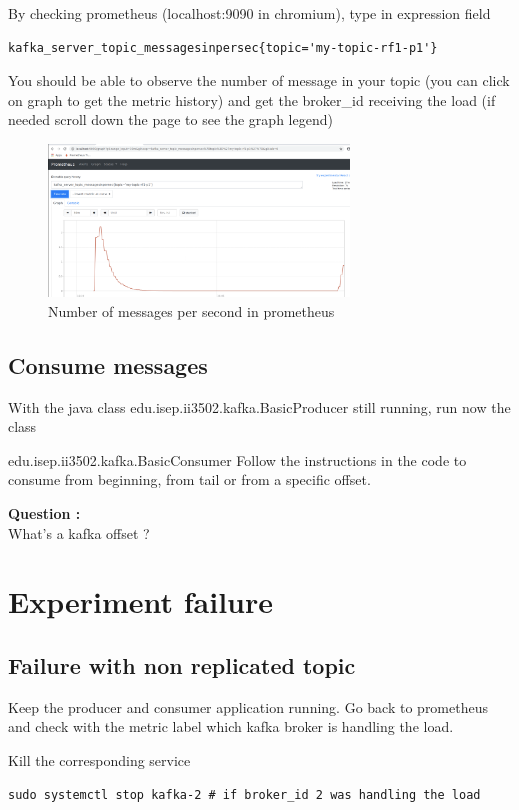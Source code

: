 \documentclass{article}
\newcounter{question}
\newenvironment{question}
    { \begin{mdframed}[backgroundcolor=gray!20] \textbf{Question \arabic{question} : } \stepcounter{question} \\}
    {  \end{mdframed}}
\newenvironment{code}
    { \begin{mdframed} }    {  \end{mdframed}}
\begin{document}
By checking prometheus (localhost:9090 in chromium), type in expression field
  \begin{verbatim}
kafka_server_topic_messagesinpersec{topic='my-topic-rf1-p1'}
    \end{verbatim}

You should be able to observe the number of message in your topic (you can click on graph to get the metric history) and get the broker_id receiving the load (if needed scroll down the page to see the graph legend)

\begin{figure}[H]
\includegraphics[width=8cm]{prometheus.png}
\caption{Number of messages per second in prometheus}
\centering
\end{figure}

\subsection{Consume messages}
With the java class edu.isep.ii3502.kafka.BasicProducer still running, run now the class


edu.isep.ii3502.kafka.BasicConsumer
Follow the instructions in the code to consume from beginning, from tail or from a specific offset.

\begin{question}
 What's a kafka offset ?
\end{question}

\section{Experiment failure}
\subsection{Failure with non replicated topic}

Keep the producer and consumer application running. Go back to prometheus and check with the metric label which kafka broker is handling the load.

Kill the corresponding service
\begin{code}
    \begin{verbatim}
sudo systemctl stop kafka-2 # if broker_id 2 was handling the load \end{verbatim}
\end{code}
\end{document}
